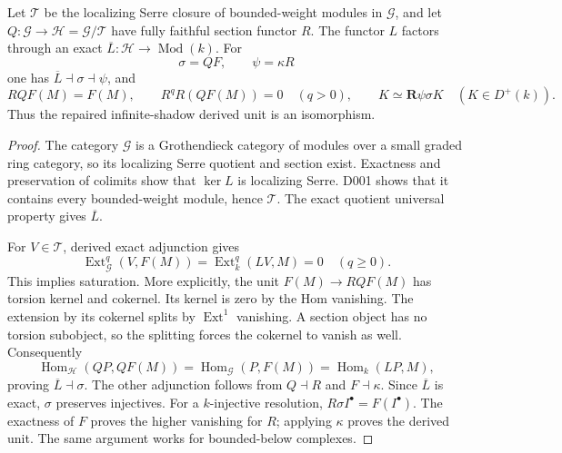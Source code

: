 \begin{theorem}
\label{sa08:D005}
Let $\mathcal T$ be the localizing Serre closure of bounded-weight
modules in $\mathcal G$, and let $Q:\mathcal G\to\mathcal H=
\mathcal G/\mathcal T$ have fully faithful section functor $R$.
The functor $L$ factors through an exact $\overline L:\mathcal H
\to\operatorname{Mod}(k)$. For
\[
 \sigma=QF,\qquad\psi=\kappa R
\]
one has $\overline L\dashv\sigma\dashv\psi$, and
\[
 RQF(M)=F(M),\qquad R^qR(QF(M))=0\quad(q>0),\qquad
 K\simeq\mathbf R\psi\sigma K\quad(K\in D^+(k)).
\]
Thus the repaired infinite-shadow derived unit is an isomorphism.
\end{theorem}
\begin{proof}
The category $\mathcal G$ is a Grothendieck category of modules over
a small graded ring category, so its localizing Serre quotient and
section exist. Exactness and preservation of colimits show that
$\ker L$ is localizing Serre. D001 shows that it contains every
bounded-weight module, hence $\mathcal T$. The exact quotient
universal property gives $\overline L$.

For $V\in\mathcal T$, derived exact adjunction gives
\[
 \operatorname{Ext}^q_{\mathcal G}(V,F(M))
 =\operatorname{Ext}^q_k(LV,M)=0\quad(q\geq0).
\]
This implies saturation. More explicitly, the unit
$F(M)\to RQF(M)$ has torsion kernel and cokernel. Its kernel is
zero by the Hom vanishing. The extension by its cokernel splits by
$\operatorname{Ext}^1$ vanishing. A section object has no torsion
subobject, so the splitting forces the cokernel to vanish as well.
Consequently
\[
 \operatorname{Hom}_{\mathcal H}(QP,QF(M))
 =\operatorname{Hom}_{\mathcal G}(P,F(M))
 =\operatorname{Hom}_k(LP,M),
\]
proving $\overline L\dashv\sigma$. The other adjunction follows
from $Q\dashv R$ and $F\dashv\kappa$. Since $\overline L$ is exact,
$\sigma$ preserves injectives. For a $k$-injective resolution,
$R\sigma I^\bullet=F(I^\bullet)$. The exactness of $F$ proves the
higher vanishing for $R$; applying $\kappa$ proves the derived unit.
The same argument works for bounded-below complexes.
\end{proof}

